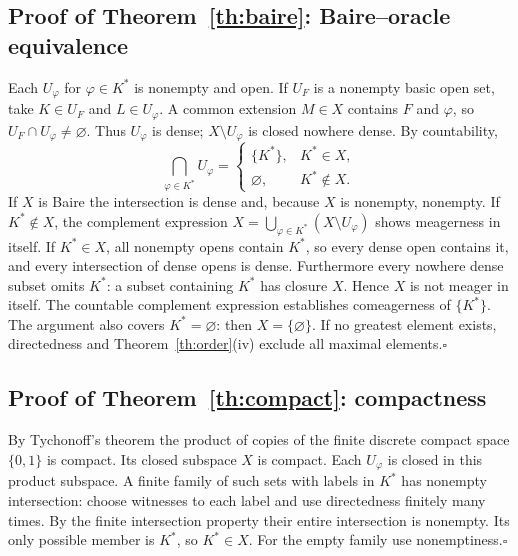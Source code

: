 \documentclass[11pt]{article}
\begin{document}
\subsection{Proof of Theorem~\ref{th:baire}: Baire--oracle equivalence}
Each $U_\varphi$ for $\varphi\in K^*$ is nonempty and open. If $U_F$ is a nonempty basic open set, take $K\in U_F$ and $L\in U_\varphi$. A common extension $M\in X$ contains $F$ and $\varphi$, so $U_F\cap U_\varphi\ne\varnothing$. Thus $U_\varphi$ is dense; $X\setminus U_\varphi$ is closed nowhere dense. By countability,
\[
\bigcap_{\varphi\in K^*} U_\varphi=\begin{cases}\{K^*\},&K^*\in X,\\\varnothing,&K^*\notin X.\end{cases}
\]
If $X$ is Baire the intersection is dense and, because $X$ is nonempty, nonempty. If $K^*\notin X$, the complement expression $X=\bigcup_{\varphi\in K^*}(X\setminus U_\varphi)$ shows meagerness in itself. If $K^*\in X$, all nonempty opens contain $K^*$, so every dense open contains it, and every intersection of dense opens is dense. Furthermore every nowhere dense subset omits $K^*$: a subset containing $K^*$ has closure $X$. Hence $X$ is not meager in itself. The countable complement expression establishes comeagerness of $\{K^*\}$. The argument also covers $K^*=\varnothing$: then $X=\{\varnothing\}$. If no greatest element exists, directedness and Theorem~\ref{th:order}(iv) exclude all maximal elements.\hfill$\square$

\subsection{Proof of Theorem~\ref{th:compact}: compactness}
By Tychonoff's theorem the product of copies of the finite discrete compact space $\{0,1\}$ is compact. Its closed subspace $X$ is compact. Each $U_\varphi$ is closed in this product subspace. A finite family of such sets with labels in $K^*$ has nonempty intersection: choose witnesses to each label and use directedness finitely many times. By the finite intersection property their entire intersection is nonempty. Its only possible member is $K^*$, so $K^*\in X$. For the empty family use nonemptiness.\hfill$\square$
\end{document}
